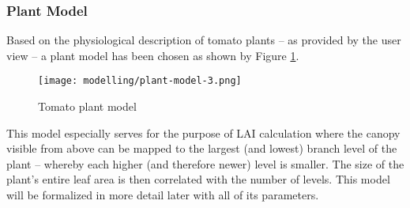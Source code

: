\graphicspath{{members/ssr/figures/}}

\subsubsection*{Plant Model}

Based on the physiological description of tomato plants -- as provided by the user view -- a plant model has
been chosen as shown by Figure \ref{fig:plant:model:2}.

\begin{figure}[H]
    \centering
    \texttt{[image: modelling/plant-model-3.png]}
    \caption{Tomato plant model}
    \label{fig:plant:model:2}
\end{figure}

This model especially serves for the purpose of LAI calculation where the canopy visible from above can 
be mapped to the largest (and lowest) branch level of the plant -- whereby each higher (and therefore newer)
level is smaller.
The size of the plant's entire leaf area is then correlated with the number of levels.
This model will be formalized in more detail later with all of its parameters. 